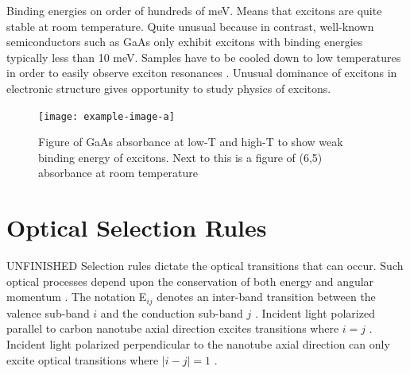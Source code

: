 Binding energies on order of hundreds of meV. Means that excitons are quite stable at room temperature. Quite unusual because in contrast, well-known semiconductors such as GaAs only exhibit excitons with binding energies typically less than 10 meV. Samples have to be cooled down to low temperatures in order to easily observe exciton resonances \cite{liang1970excitons}. Unusual dominance of excitons in electronic structure gives opportunity to study physics of excitons.



\begin{figure}[h]
	\centering
	\texttt{[image: example-image-a]}
	\caption{Figure of GaAs absorbance at low-T and high-T to show weak binding energy of excitons. Next to this is a figure of  (6,5) absorbance at room temperature}
	\label{fig:gaas_vs_cnt_absorbance}
\end{figure}


\section{Optical Selection Rules}

{\color{red}UNFINISHED} Selection rules dictate the optical transitions that can occur. Such optical processes depend upon the conservation of both energy and angular momentum \cite{weismanKonoBook}. The notation E$_{ij}$ denotes an inter-band transition between the valence sub-band $i$ and the conduction sub-band $j$ \cite{weismanKonoBook}. Incident light polarized parallel to carbon nanotube axial direction excites transitions where $i=j$ \cite{weismanKonoBook}. Incident light polarized perpendicular to the nanotube axial direction can only excite optical transitions where $|i-j|=1$ \cite{weismanKonoBook}. 


